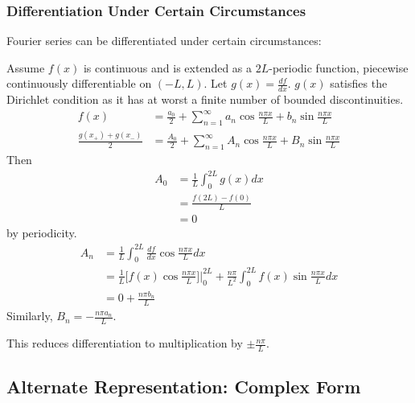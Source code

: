 \documentclass[a4paper]{article}
\begin{document}
\subsubsection{Differentiation Under Certain Circumstances}

Fourier series can be differentiated under certain circumstances: 
\begin{eg}
  Assume \(f(x)\) is continuous and is extended as a \(2L\)-periodic function, piecewise continuously differentiable on \((-L,L)\). Let \(g(x)=\frac{df}{dx}\). \(g(x)\) satisfies the Dirichlet condition as it has at worst a finite number of bounded discontinuities.
  \begin{align*}
    f(x) &= \frac{a_0}{2} + \sum_{n=1}^{\infty} a_n \cos \frac{n\pi x}{L}+ b_n \sin \frac{n\pi x}{L} \\
    \frac{g(x_+)+g(x_-)}{2} &=\frac{A_0}{2} + \sum_{n=1}^{\infty} A_n \cos \frac{n\pi x}{L} + B_n \sin \frac{n\pi x}{L}
  \end{align*}
  Then
  \begin{align*}
    A_0 &= \frac{1}{L}\int_{0}^{2L}g(x) dx \\
        &= \frac{f(2L)-f(0)}{L} \\
        &= 0
  \end{align*}
  by periodicity.
  \begin{align*}
    A_n &=\frac{1}{L} \int_{0}^{2L}\frac{df}{dx}\cos \frac{n\pi x}{L}dx \\
        &= \frac{1}{L}\Big[f(x)\cos \frac{n\pi x}{L} \Big] \Big|_0^{2L} + \frac{n\pi}{L^2} \int_{0}^{2L} f(x)\sin \frac{n\pi x}{L} dx \\
        &= 0 + \frac{n\pi b_n}{L}
      \end{align*}
      Similarly, \(B_n=-\frac{n\pi a_n}{L}\).

      This reduces differentiation to multiplication by \(\pm \frac{n\pi}{L}\).
      \end{eg}

\subsection{Alternate Representation: Complex Form}
\end{document}
